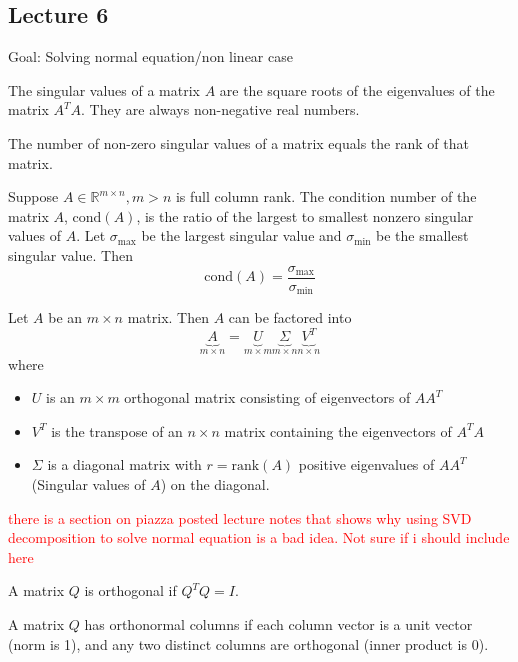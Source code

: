 \subsection{Lecture 6}
Goal: Solving normal equation/non linear case
\begin{definition}
  The singular values of a matrix $A$ are the square roots of the eigenvalues of the matrix $A^TA$. They are always non-negative real numbers.

  The number of non-zero singular values of a matrix equals the rank of that matrix.
\end{definition}
\begin{definition}
  Suppose $A \in \mathbb R^{m \times n}, m > n$ is full column rank. The condition number of the matrix $A$, $\text{cond}(A)$, is the ratio of the largest to smallest nonzero singular values of $A$. Let $\sigma_{\max}$ be the largest singular value and $\sigma_{\min}$ be the smallest singular value. Then
  $$\text{cond}(A) = \frac{\sigma_{\max}}{\sigma_{\min}}$$
\end{definition}
\begin{definition}
  Let $A$ be an $m \times n$ matrix. Then $A$ can be factored into
  $$\underbrace{A}_{m \times n} = \underbrace{U}_{m \times m}\underbrace{\Sigma}_{m \times n}\underbrace{V^T}_{n \times n}$$
  where
  \begin{itemize}
    \item $U$ is an $m \times m$ orthogonal matrix consisting of eigenvectors of $AA^T$
    \item $V^T$ is the transpose of an $n \times n$ matrix containing the eigenvectors of $A^TA$
    \item $\Sigma$ is a diagonal matrix with $r = \text{rank}(A)$ positive eigenvalues of $AA^T$ (Singular values of $A$) on the diagonal.
  \end{itemize}
\end{definition}
\textcolor{red}{there is a section on piazza posted lecture notes that shows why using SVD decomposition to solve normal equation is a bad idea. Not sure if i should include here}
\begin{definition}
  A matrix $Q$ is orthogonal if $Q^TQ = I$.
\end{definition}
\begin{definition}
  A matrix $Q$ has orthonormal columns if each column vector is a unit vector (norm is 1), and any two distinct columns are orthogonal (inner product is 0).
\end{definition}


